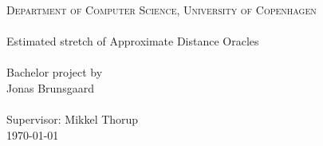 \begin{titlingpage}
\begin{center}

\normalfont \normalsize
\textsc{Department of Computer Science, University of Copenhagen} \\ [25pt]
\horrule{0.5pt} \\ [0.4cm]
\huge Estimated stretch of Approximate Distance Oracles \\
\horrule{2pt} \\ [0.5cm]
\normalfont \normalsize
Bachelor project by \\ \normalsize
Jonas Brunsgaard \\ \normalsize
{} \\ [+6pt] \normalsize
Supervisor: Mikkel Thorup \\ [+6pt] \normalsize
\today

\end{center}
\end{titlingpage}
